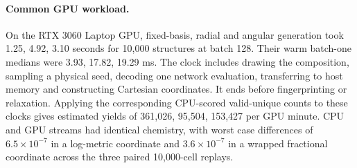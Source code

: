 \paragraph{Common GPU workload.} On the RTX 3060 Laptop GPU, fixed-basis, radial and angular generation took 1.25, 4.92, 3.10 seconds for 10,000 structures at batch 128. Their warm batch-one medians were 3.93, 17.82, 19.29 ms. The clock includes drawing the composition, sampling a physical seed, decoding one network evaluation, transferring to host memory and constructing Cartesian coordinates. It ends before fingerprinting or relaxation. Applying the corresponding CPU-scored valid-unique counts to these clocks gives estimated yields of 361,026, 95,504, 153,427 per GPU minute. CPU and GPU streams had identical chemistry, with worst case differences of $6.5\times10^{-7}$ in a log-metric coordinate and $3.6\times10^{-7}$ in a wrapped fractional coordinate across the three paired 10,000-cell replays.
